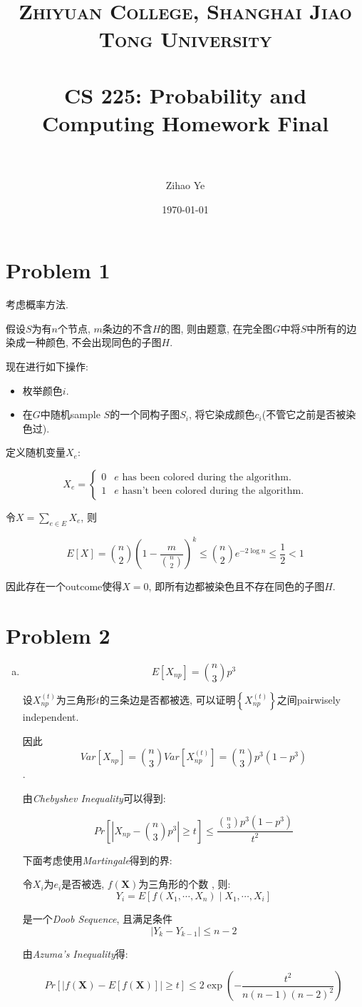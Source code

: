 \documentclass[paper=a4, fontsize=11pt]{scrartcl} %
\title{	
\normalfont \normalsize 
\textsc{Zhiyuan College, Shanghai Jiao Tong University} \\ %
\horrule{0.5pt} \\[0.4cm] %
\huge CS 225: Probability and Computing Homework Final \\ %
\horrule{2pt} \\ %
}
\author{
\normalsize
	Zihao Ye
} %
\date{\normalsize\today} %
\numberwithin{figure}{section} %
\numberwithin{table}{section} %
\begin{document}
\maketitle %

\section*{Problem 1}
考虑概率方法.

假设$S$为有$n$个节点, $m$条边的不含$H$的图, 则由题意, 在完全图$G$中将$S$中所有的边染成一种颜色, 不会出现同色的子图$H$.

现在进行如下操作:
\begin{itemize}
	\item 枚举颜色$i$.
	\item 在$G$中随机sample $S$的一个同构子图$S_i$, 将它染成颜色$c_i$(不管它之前是否被染色过).
\end{itemize}

定义随机变量$X_e$:

$$X_e = \left\{ 
\begin{array}{ll}
0 & e \textrm{ has been colored during the algorithm.} \\
1 & e \textrm{ hasn't been colored during the algorithm.} 
\end{array}
\right. $$

令$X = \sum\limits_{e\in E} X_e$, 则

$$E[X] = {n\choose2}\left(1-\frac{m}{{n\choose 2}}\right)^k \leq {n\choose 2}e^{-2\log n} \leq \frac{1}{2} < 1$$

因此存在一个outcome使得$X = 0$, 即所有边都被染色且不存在同色的子图$H$.

\section*{Problem 2}
\begin{enumerate}[(a)]
	\item 
	$$E[X_{np}] = {n\choose 3}p^3 $$

	设$X_{np}^{(t)}$为三角形$t$的三条边是否都被选, 可以证明$\left\{X_{np}^{(t)}\right\}$之间pairwisely independent.

	因此$$\textit{Var}\left[X_{np}\right] = {n\choose 3}\textit{Var}\left[X_{np}^{(t)}\right] = {n\choose 3}p^3(1-p^3)$$.

	由\textit{Chebyshev Inequality}可以得到:

	$$\textit{Pr}\left[\left|X_{np} - {n\choose 3}p^3\right|\geq t\right] \leq \frac{{n\choose 3}p^3(1-p^3)}{t^2}$$

	下面考虑使用\textit{Martingale}得到的界:

	令$X_i$为$e_i$是否被选, $f(\mathbf{X})$为三角形的个数 , 则:
	$$Y_i = E\left[f(X_1, \cdots, X_n) \mid X_1, \cdots, X_i \right]$$

	是一个\textit{Doob Sequence}, 且满足条件
	$$\left|Y_k - Y_{k-1}\right| \leq n - 2 $$

	由\textit{Azuma's Inequality}得:

	$$Pr\left[\left|f(\mathbf{X}) - E\left[f(\mathbf{X})\right]\right| \geq t\right]\leq 2 \exp\left(-\frac{t^2}{n(n-1)(n-2)^2}\right) $$
\end{enumerate}
\end{document}
